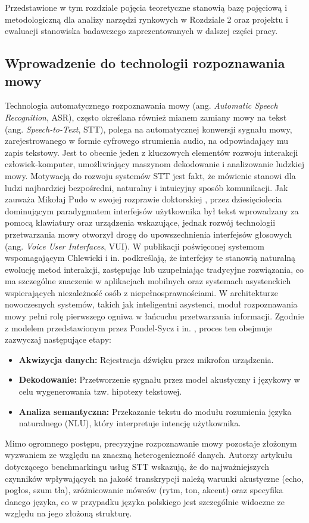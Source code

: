 Przedstawione w tym rozdziale pojęcia teoretyczne stanowią bazę pojęciową i metodologiczną dla analizy narzędzi rynkowych w Rozdziale 2 oraz projektu i ewaluacji stanowiska badawczego zaprezentowanych w dalszej części pracy.

\subsection{Wprowadzenie do technologii rozpoznawania mowy}
Technologia automatycznego rozpoznawania mowy (ang. \textit{Automatic Speech Recognition}, ASR), często określana również mianem zamiany mowy na tekst (ang. \textit{Speech-to-Text}, STT), polega na automatycznej konwersji sygnału mowy, zarejestrowanego w formie cyfrowego strumienia audio, na odpowiadający mu zapis tekstowy. Jest to obecnie jeden z kluczowych elementów rozwoju interakcji człowiek-komputer, umożliwiający maszynom dekodowanie i analizowanie ludzkiej mowy.
Motywacją do rozwoju systemów STT jest fakt, że mówienie stanowi dla ludzi najbardziej bezpośredni, naturalny i intuicyjny sposób komunikacji. Jak zauważa Mikołaj Pudo w swojej rozprawie doktorskiej \cite[s.~14]{pudo2024optimizing}, przez dziesięciolecia dominującym paradygmatem interfejsów użytkownika był tekst wprowadzany za pomocą klawiatury oraz urządzenia wskazujące, jednak rozwój technologii przetwarzania mowy otworzył drogę do upowszechnienia interfejsów głosowych (ang. \textit{Voice User Interfaces}, VUI). W publikacji poświęconej systemom wspomagającym Chlewicki i in. \cite[s.~314]{chlewicki2024potencjal} podkreślają, że interfejsy te stanowią naturalną ewolucję metod interakcji, zastępując lub uzupełniając tradycyjne rozwiązania, co ma szczególne znaczenie w aplikacjach mobilnych oraz systemach asystenckich wspierających niezależność osób z niepełnosprawnościami.
W architekturze nowoczesnych systemów, takich jak inteligentni asystenci, moduł rozpoznawania mowy pełni rolę pierwszego ogniwa w łańcuchu przetwarzania informacji. Zgodnie z modelem przedstawionym przez Pondel-Sycz i in. \cite[s.~315]{pondel2024e2e}, proces ten obejmuje zazwyczaj następujące etapy:
\begin{itemize}
\item \textbf{Akwizycja danych:} Rejestracja dźwięku przez mikrofon urządzenia.

\item \textbf{Dekodowanie:} Przetworzenie sygnału przez model akustyczny i językowy w celu wygenerowania tzw. hipotezy tekstowej.

\item \textbf{Analiza semantyczna:} Przekazanie tekstu do modułu rozumienia języka naturalnego (NLU), który interpretuje intencję użytkownika.
\end{itemize}
Mimo ogromnego postępu, precyzyjne rozpoznawanie mowy pozostaje złożonym wyzwaniem ze względu na znaczną heterogeniczność danych. Autorzy artykułu dotyczącego benchmarkingu usług STT \cite[s.~1]{ferraro2023benchmarking} wskazują, że do najważniejszych czynników wpływających na jakość transkrypcji należą warunki akustyczne (echo, pogłos, szum tła), zróżnicowanie mówców (rytm, ton, akcent) oraz specyfika danego języka, co w przypadku języka polskiego jest szczególnie widoczne ze względu na jego złożoną strukturę.


